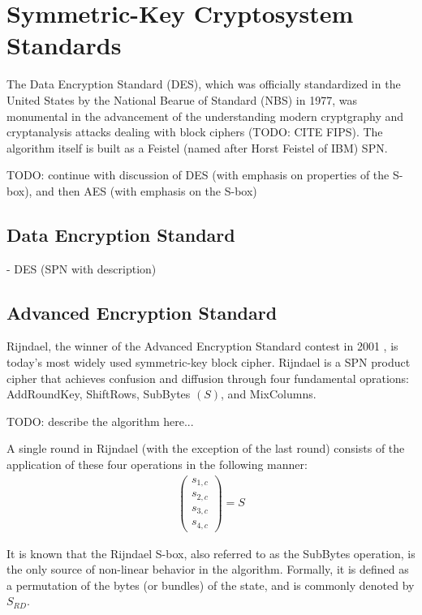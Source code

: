 \section{Symmetric-Key Cryptosystem Standards}
The Data Encryption Standard (DES), which was officially standardized in the United States
by the National Bearue of Standard (NBS) in 1977, was monumental in the advancement of
the understanding modern cryptgraphy and cryptanalysis attacks dealing with block ciphers (TODO: CITE FIPS).
The algorithm itself is built as a Feistel (named after Horst Feistel of IBM) SPN. 

TODO: continue with discussion of DES (with emphasis on properties of the S-box), and then AES (with emphasis on
the S-box)

\subsection{Data Encryption Standard}
- DES (SPN with description)

\subsection{Advanced Encryption Standard}
Rijndael, the winner of the Advanced Encryption Standard contest in 2001 \cite{daemen01-AES}, is today's 
most widely used symmetric-key block cipher. Rijndael is a SPN product cipher that achieves confusion 
and diffusion through four fundamental oprations: AddRoundKey, ShiftRows, SubBytes $(S)$, and MixColumns. 

TODO: describe the algorithm here...

A single round in Rijndael (with the exception of the last round) consists of the application
of these four operations in the following manner:
\begin{align*}
\left( \begin{array}{c}
s_{1,c} \\
s_{2,c} \\
s_{3,c} \\
s_{4,c} \end{array} \right) = S
\end{align*}

It is known that the Rijndael S-box, also referred to as the SubBytes operation, is the only source of non-linear behavior in the algorithm. Formally, it is defined as a permutation of the bytes (or bundles) of the state, and is commonly denoted by $S_{RD}$. 

